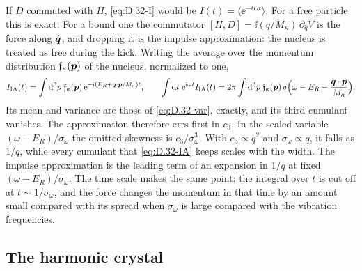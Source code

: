 If $D$ commuted with $H$, \cref{eq:D.32-I} would be $I(t) = \langle\ee^{-\ii Dt}\rangle$. For a free particle this is exact. For a bound one the commutator $[H, D] = \ii(q/M_\kappa)\,\partial_{\hat q}V$ is the force along $\hat{\bm{q}}$, and dropping it is the impulse approximation: the nucleus is treated as free during the kick. Writing the average over the momentum distribution $\mathfrak{f}_\kappa(\bm{p})$ of the nucleus, normalized to one,
\begin{equation}
  I_{\mathrm{IA}}(t) = \int\mathrm{d}^3p\;\mathfrak{f}_\kappa(\bm{p})\,\mathrm{e}^{-\mathrm{i}(E_R + \bm{q}\cdot\bm{p}/M_\kappa)t} , \qquad
  \int\mathrm{d} t\;\mathrm{e}^{\mathrm{i}\omega t}I_{\mathrm{IA}}(t) = 2\pi\int\mathrm{d}^3p\;\mathfrak{f}_\kappa(\bm{p})\,\delta\Bigl(\omega - E_R - \frac{\bm{q}\cdot\bm{p}}{M_\kappa}\Bigr) .
  \label{eq:D.32-IA}
\end{equation}
Its mean and variance are those of \cref{eq:D.32-var}, exactly, and its third cumulant vanishes. The approximation therefore errs first in $c_3$. In the scaled variable $(\omega - E_R)/\sigma_\omega$ the omitted skewness is $c_3/\sigma_\omega^3$. With $c_3 \propto q^2$ and $\sigma_\omega \propto q$, it falls as $1/q$, while every cumulant that \cref{eq:D.32-IA} keeps scales with the width. The impulse approximation is the leading term of an expansion in $1/q$ at fixed $(\omega - E_R)/\sigma_\omega$. The time scale makes the same point: the integral over $t$ is cut off at $t \sim 1/\sigma_\omega$, and the force changes the momentum in that time by an amount small compared with its spread when $\sigma_\omega$ is large compared with the vibration frequencies.

\subsection{The harmonic crystal}

